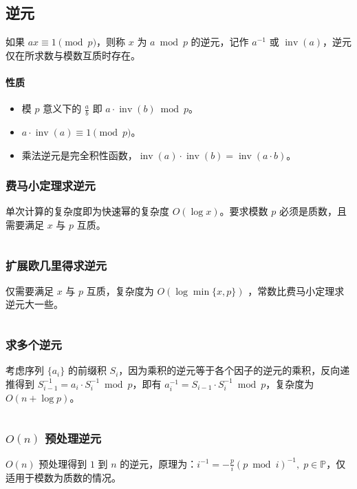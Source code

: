 \documentclass[a4paper, twoside]{article}
\DeclareMathOperator*{\inv}{inv}                %
\begin{document}
\subsection{逆元}
如果 $ax \equiv 1\pmod p$，则称 $x$ 为 $a \bmod p$ 的逆元，记作 $a^{-1}$ 或 $\inv(a)$，逆元仅在所求数与模数互质时存在。
\paragraph{性质}
\begin{itemize}
    \item 模 $p$ 意义下的 $\frac{a}{b}$ 即 $a \cdot \inv(b) \bmod p$。
    \item $a \cdot \inv(a) \equiv 1\pmod p$。
    \item 乘法逆元是完全积性函数，$\inv(a) \cdot \inv(b) = \inv(a \cdot b)$。
\end{itemize}



    \subsubsection{费马小定理求逆元}
    单次计算的复杂度即为快速幂的复杂度 $O(\log x)$。要求模数 $p$ 必须是质数，且需要满足 $x$ 与 $p$ 互质。
    \inputminted{cpp}{../src/数论/费马小定理求逆元.cpp}

    \subsubsection{扩展欧几里得求逆元}
    仅需要满足 $x$ 与 $p$ 互质，复杂度为 $O(\log \min\{x, p\})$ ，常数比费马小定理求逆元大一些。
    \inputminted{cpp}{../src/数论/扩展欧几里得求逆元.cpp}

    \subsubsection{求多个逆元}
    考虑序列 $\{a_i\}$ 的前缀积 $S_i$，因为乘积的逆元等于各个因子的逆元的乘积，反向递推得到 $S_{i-1}^{-1}=a_i \cdot S_i^{-1} \bmod p$，即有 $a_i^{-1}=S_{i-1} \cdot S_i^{-1} \bmod p$，复杂度为 $O(n + \log p)$。
    \inputminted{cpp}{../src/数论/求多个逆元.cpp}

    \subsubsection{$O(n)$ 预处理逆元}
    $O(n)$ 预处理得到 $1$ 到 $n$ 的逆元，原理为：$i ^ {-1} = - \frac p i \left( p \bmod i \right) ^ {-1},\; p \in \mathbb{P}$，仅适用于模数为质数的情况。
    \inputminted{cpp}{../src/数论/O(n)预处理逆元.cpp}
\end{document}
